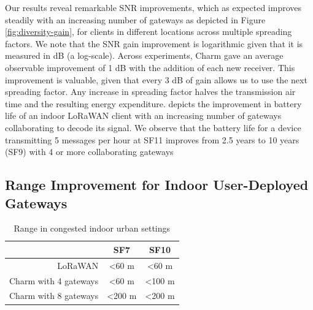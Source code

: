 Our results reveal remarkable SNR improvements, which as expected improves
steadily with an increasing number of gateways as depicted in Figure
\ref{fig:diversity-gain}, for clients in different locations across multiple
spreading factors. We note that the SNR gain improvement is logarithmic given
that it is measured in dB (a log-scale). Across experiments, Charm gave an
average observable improvement of 1 dB with the addition of each new receiver.
This improvement is valuable, given that every 3 dB of gain allows us to use
the next spreading factor. Any increase in spreading factor halves the
transmission air time and the resulting energy expenditure.
 depicts the improvement in battery life of an
indoor LoRaWAN client with an increasing number of gateways collaborating to
decode its signal. We observe that the battery life for a device transmitting
5 messages per hour at SF11 improves from 2.5 years to 10 years (SF9) with 4
or more collaborating gateways


\subsection{Range Improvement for Indoor User-Deployed Gateways}

\begin{table}[t]
\centering
\begin{tabular}{r|c|c|}
\cline{2-3}
\multicolumn{1}{l|}{}            & SF7            & SF10           \\ \hline
\multicolumn{1}{|r|}{LoRaWAN}       & \textless60 m  & \textless60 m  \\ \hline
\multicolumn{1}{|r|}{Charm with 4 gateways} & \textless60 m  & \textless100 m \\ \hline
\multicolumn{1}{|r|}{Charm with 8 gateways} & \textless200 m & \textless200 m \\ \hline
\end{tabular}
\caption{Range in congested indoor urban settings}
\label{tab:range}
\compactimg
\compactimg
\end{table}

